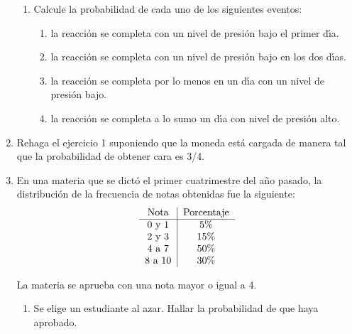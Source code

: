 \documentclass[a4paper, 11pt]{article}
\begin{document}
\begin{enumerate}
\begin{enumerate}
	\item Calcule  la probabilidad de cada uno de los siguientes eventos:
	
	\begin{enumerate}
		\item  la reacci\'{o}n se completa con un nivel de presi\'{o}n bajo el primer d\'{\i}a.
		
		\item  la reacci\'{o}n se completa con un nivel de presi\'{o}n bajo en los dos d\'{\i}as.
		
		\item  la reacci\'{o}n se completa por lo menos en un d\'{\i}a con un nivel de presi\'{o}n bajo.
		
		\item  la reacci\'{o}n se completa a lo sumo un d\'{\i}a con nivel de presi\'{o}n alto.
	\end{enumerate}
	
\end{enumerate}




\item Rehaga el ejercicio 1 suponiendo que la moneda est\'{a} cargada de
manera tal que la probabilidad de obtener cara es 3/4. %


\item En una materia que se dict\'{o} el primer cuatrimestre del a\~{n}o
pasado, la distribuci\'{o}n de la frecuencia de notas obtenidas fue la
siguiente:\vspace{-0.1cm}%
\[%
\begin{tabular}
[c]{c|c}%
Nota & Porcentaje\\\hline
0 y 1 & 5\%\\
2 y 3 & 15\%\\
4 a 7 & 50\%\\
8 a 10 & 30\%
\end{tabular}
\]
\vspace{-0.2cm}


La materia se aprueba con una nota mayor o igual a 4.


\begin{enumerate}
\item \vspace{-0.1cm}Se elige un estudiante al azar. Hallar la probabilidad de
que haya aprobado.



\end{enumerate}
\end{enumerate}
\end{document}
